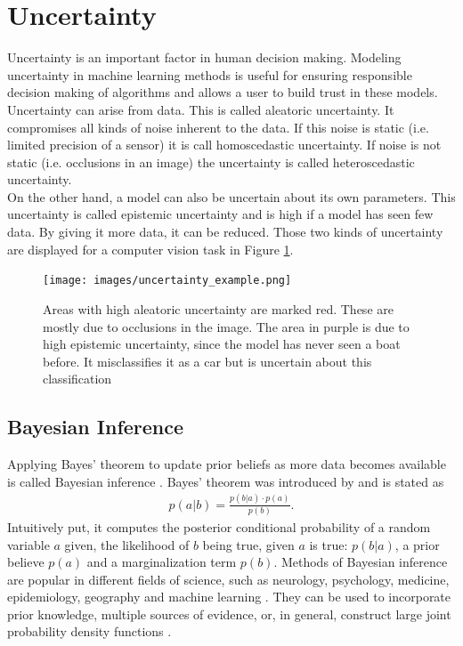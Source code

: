 \documentclass[a4paper,cleardoubleempty,BCOR1cm, 11pt]{report}
\begin{document}
\section{Uncertainty}
Uncertainty is an important factor in human decision making. Modeling uncertainty in machine learning methods is useful for ensuring responsible decision making of algorithms and allows a user to build trust in these models. Uncertainty can arise from data. This is called aleatoric uncertainty. It compromises all kinds of noise inherent to the data. If this noise is static (i.e. limited precision of a sensor) it is call homoscedastic uncertainty. If noise is not static (i.e. occlusions in an image) the uncertainty is called heteroscedastic uncertainty.\\
On the other hand, a model can also be uncertain about its own parameters. This uncertainty is called epistemic uncertainty and is high if a model has seen few data. By giving it more data, it can be reduced. Those two kinds of uncertainty are displayed for a computer vision task in Figure \ref{fig:uncertainty_example}.
\begin{figure}
	\centering
	\texttt{[image: images/uncertainty\_example.png]} 
	\caption{Areas with high aleatoric uncertainty are marked red. These are mostly due to occlusions in the image. The area in purple is due to high epistemic uncertainty, since the model has never seen a boat before. It misclassifies it as a car but is uncertain about this classification}
	\label{fig:uncertainty_example}
\end{figure}

\subsection{Bayesian Inference}
Applying Bayes' theorem to update prior beliefs as more data becomes available is called Bayesian inference \cite{box2011bayesian}. Bayes' theorem was introduced by \citet{bayes1763lii} and is stated as
\begin{align*}
	p(a|b) = \frac{p(b|a) \cdot p(a)}{p(b)}.
\end{align*}
Intuitively put, it computes the posterior conditional probability of a random variable $a$ given, the likelihood of $b$ being true, given $a$ is true: $p(b|a)$, a prior believe $p(a)$ and a marginalization term $p(b)$. Methods of Bayesian inference are popular in different fields of science, such as neurology, psychology, medicine, epidemiology, geography and machine learning \cite{friston2002classical,wagenmakers2018bayesian,koch2006bayesian,parmigiani2002modeling,didelot2014bayesian,ghahramani2015probabilistic}. They can be used to incorporate prior knowledge, multiple sources of evidence, or, in general, construct large joint probability density functions \cite{Spiegelhalter:2009}.
\end{document}

